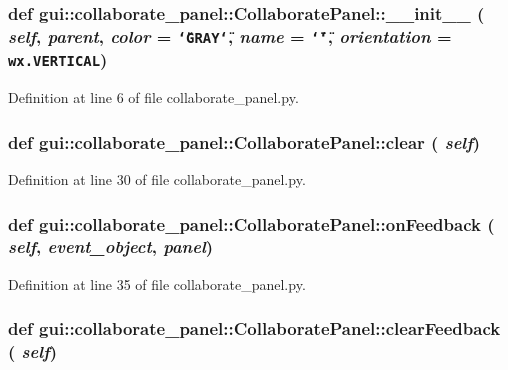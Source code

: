 \subsubsection{\setlength{\rightskip}{0pt plus 5cm}def gui::collaborate\_\-panel::CollaboratePanel::\_\-\_\-init\_\-\_\- ( {\em self},  {\em parent},  {\em color} = {\tt \char`\"{}GRAY\char`\"{}},  {\em name} = {\tt \char`\"{}\char`\"{}},  {\em orientation} = {\tt wx.VERTICAL})}\label{classgui_1_1collaborate__panel_1_1CollaboratePanel_f7eb9684dcff03bcf33064eb4dd2ab7b}




Definition at line 6 of file collaborate\_\-panel.py.
\subsubsection{\setlength{\rightskip}{0pt plus 5cm}def gui::collaborate\_\-panel::CollaboratePanel::clear ( {\em self})}\label{classgui_1_1collaborate__panel_1_1CollaboratePanel_ef5f7d0708303d207c93aa61d7450103}




Definition at line 30 of file collaborate\_\-panel.py.
\subsubsection{\setlength{\rightskip}{0pt plus 5cm}def gui::collaborate\_\-panel::CollaboratePanel::onFeedback ( {\em self},  {\em event\_\-object},  {\em panel})}\label{classgui_1_1collaborate__panel_1_1CollaboratePanel_311a55b922d7da46660dd974f870cb48}




Definition at line 35 of file collaborate\_\-panel.py.
\subsubsection{\setlength{\rightskip}{0pt plus 5cm}def gui::collaborate\_\-panel::CollaboratePanel::clearFeedback ( {\em self})}\label{classgui_1_1collaborate__panel_1_1CollaboratePanel_beb2b223b2daf7f3fc25a6325251ea5b}




